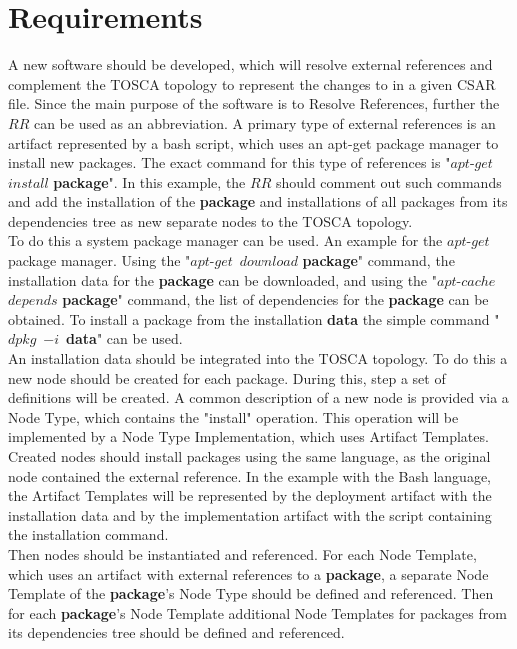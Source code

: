 
\chapter{Requirements}\label{chap:req}
A new software should be developed, which will resolve external references and complement the TOSCA topology to represent the changes to in a given CSAR file.
Since the main purpose of the software is to Resolve References, further the $RR$ can be used as an abbreviation. 
A primary type of external references is an artifact represented by a bash script, which uses an apt-get package manager to install new packages.
The exact command for this type of references is "$apt$-$get$~$install$ \textbf{package}".
In this example, the $RR$ should comment out such commands and add the installation of the \textbf{package} and installations of all packages from its dependencies tree as new separate nodes to the TOSCA topology. \\
To do this a system package manager can be used. 
An example for the $apt$-$get$ package manager. Using the "$apt$-$get$~$download$ \textbf{package}" command, the installation data for the \textbf{package} can be downloaded, and using the "$apt$-$cache$ $depends$ \textbf{package}" command, the list of dependencies for the \textbf{package} can be obtained. 
To install a package from the installation \textbf{data} the simple command "$dpkg$~$-i$~\textbf{data}" can be used.\\
An installation data should be integrated into the TOSCA topology. 
To do this a new node should be created for each package. 
During this, step a set of definitions will be created.
A common description of a new node is provided via a Node Type, which contains the "install" operation. 
This operation will be implemented by a Node Type Implementation, which uses Artifact Templates.
Created nodes should install packages using the same language, as the original node contained the external reference.
In the example with the Bash language, the Artifact Templates will be represented by the deployment artifact with the installation data and by the implementation artifact with the script containing the installation command. \\
Then nodes should be instantiated and referenced.
For each Node Template, which uses an artifact with external references to a \textbf{package}, a separate Node Template of the \textbf{package}'s Node Type should be defined and referenced.
Then for each \textbf{package}'s Node Template additional Node Templates for packages from its dependencies tree should be defined and referenced.
